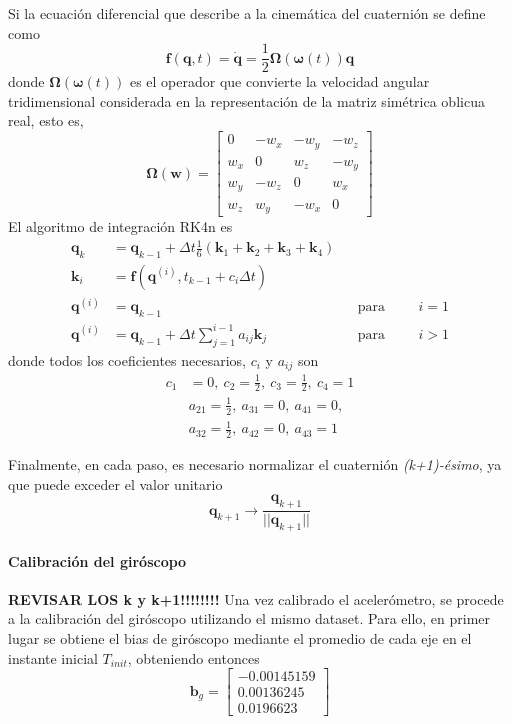 Si la ecuación diferencial que describe a la cinemática del cuaternión se define como
\begin{equation}
    \bm{f}(\bm{q},t) = \dot{\bm{q}} = \frac{1}{2}\bm{\Omega}(\bm{\omega}(t))\bm{q}
\end{equation}
donde $\bm{\Omega}(\bm{\omega}(t))$ es el operador que convierte la velocidad angular tridimensional considerada en la representación de la matriz simétrica oblicua real, esto es,
\begin{equation}
    \bm{\Omega}(\bm{w}) = 
    \begin{bmatrix}
        0 & -w_x & -w_y & -w_z \\
        w_x & 0 & w_z & -w_y \\
        w_y & -w_z & 0 & w_x \\
        w_z & w_y & -w_x & 0
    \end{bmatrix}
\end{equation}
El algoritmo de integración RK4n es
\begin{align}
    \bm{q}_{k} &= \bm{q}_{k-1} + \Delta t\frac{1}{6}(\bm{k}_1 +\bm{k}_2 + \bm{k}_3 + \bm{k}_4) \\
    \bm{k}_i &= \bm{f}(\bm{q}^{(i)},t_{k-1}+c_i\Delta t) \\
    \bm{q}^{(i)} &= \bm{q}_{k-1} &&\text{para} &&&i=1 \\
    \bm{q}^{(i)} &= \bm{q}_{k-1} + \Delta t\sum_{j=1}^{i-1}a_{ij}\bm{k}_j &&\text{para} &&&i>1
\end{align}
donde todos los coeficientes necesarios, $c_i$ y $a_{ij}$ son
\begin{align*}
    c_1 &= 0,\ c_2 = \frac{1}{2},\ c_3 = \frac{1}{2},\ c_4 = 1 \\
    &a_{21} = \frac{1}{2},\ a_{31} = 0,\ a_{41} = 0, \\
    &a_{32} = \frac{1}{2},\ a_{42} = 0,\ a_{43} = 1
\end{align*}

Finalmente, en cada paso, es necesario normalizar el cuaternión \textit{(k+1)-ésimo}, ya que puede exceder el valor unitario
\begin{equation}
    \bm{q}_{k+1} \rightarrow \frac{\bm{q}_{k+1}}{||\bm{q}_{k+1}||}
\end{equation}

\paragraph{Calibración del giróscopo}
\textbf{REVISAR LOS k y k+1!!!!!!!!}
Una vez calibrado el acelerómetro, se procede a la calibración del giróscopo utilizando el mismo dataset. Para ello, en primer lugar se obtiene el bias de giróscopo mediante el promedio de cada eje en el instante inicial $T_{init}$, obteniendo entonces
\begin{equation}
    \bm{b}_g =
    \begin{bmatrix}
         -0.00145159 \\
         0.00136245 \\
         0.0196623
    \end{bmatrix}
\end{equation}

